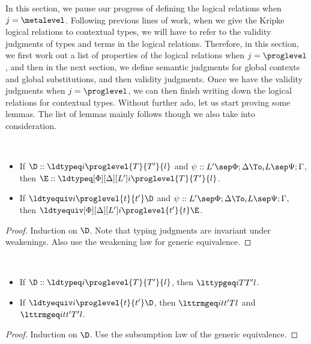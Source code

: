 In this section, we pause our progress of defining the logical relations when $j =
\metalevel$. %
Following previous lines of work, when we give the Kripke logical relations to
contextual types, we will have to refer to the validity judgments of types and terms
in the logical relations. %
Therefore, in this section, we first work out a list of properties of the logical
relations when $j = \proglevel$, and then in the next section, we define semantic judgments for
global contexts and global substitutions, and then validity judgments. %
Once we have the validity judgments when $j = \proglevel$, we can then finish writing down the
logical relations for contextual types. %
Without further ado, let us start proving some lemmas. %
The list of lemmas mainly follows \citet{abel_normalization_2013,hu_jang_pientka_2023}
though we also take \citet{abel_decidability_2017} into consideration. 

\begin{lemma}[Weakening] $ $
  \begin{itemize}
  \item If $\D :: \ldtypeq i \proglevel{T}{T'}{l}$ and
    $\psi :: L' \sep \Phi;\Delta \To_i L \sep \Psi; \Gamma$, then
    $\E :: \ldtypeq[\Phi][\Delta][L'] i \proglevel{T}{T'}{l}$.
  \item If $\ldtyequiv i \proglevel{t}{t'}\D$ and
    $\psi :: L' \sep \Phi;\Delta \To_i L \sep \Psi; \Gamma$, then
    $\ldtyequiv[\Phi][\Delta][L'] i \proglevel{t'}{t}\E$.
  \end{itemize}
\end{lemma}
\begin{proof}
  Induction on $\D$. %
  Note that typing judgments are invariant under weakenings. %
  Also use the weakening law for generic equivalence. %
\end{proof}

\begin{lemma}[Escape] $ $
  \begin{itemize}
  \item If $\D :: \ldtypeq i \proglevel{T}{T'}{l}$, then $\lttypgeq i {T}{T'} l$.
  \item If $\ldtyequiv i \proglevel{t}{t'}\D$, then $\lttrmgeq i t{t'} T l$ and $\lttrmgeq i t{t'}{T'} l$.
  \end{itemize}  
\end{lemma}
\begin{proof}
  Induction on $\D$. %
  Use the subsumption law of the generic equivalence. %
\end{proof}


